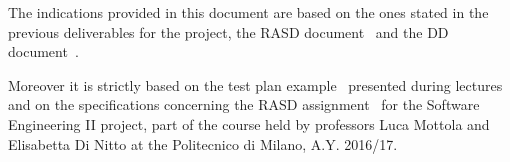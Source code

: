 The indications provided in this document are based on the ones stated in the previous deliverables for the project, the RASD document~\cite{rasd} and the DD document~\cite{dd}.

Moreover it is strictly based on the test plan example~\cite{testplan_ex} presented during lectures and on the specifications concerning the RASD assignment~\cite{se-assignments} for the Software Engineering II project, part of the course held by professors Luca Mottola and Elisabetta Di Nitto at the Politecnico di Milano, A.Y. 2016/17.